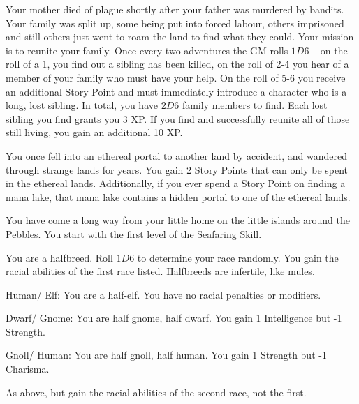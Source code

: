 \begin{multicols}{2}
\begin{list}{\addtocounter{list}{1}\textbf{:}}{\raggedleft}
	\item{Your mother died of plague shortly after your father was murdered by bandits.  Your family was split up, some being put into forced labour, others imprisoned and still others just went to roam the land to find what they could.  Your mission is to reunite your family.  Once every two adventures the GM rolls $1D6$ -- on the roll of a 1, you find out a sibling has been killed, on the roll of 2-4 you hear of a member of your family who must have your help.  On the roll of 5-6 you receive an additional Story Point and must immediately introduce a character who is a long, lost sibling.  In total, you have $2D6$ family members to find.  Each lost sibling you find grants you 3 XP.  If you find and successfully reunite all of those still living, you gain an additional 10 XP.}

	\item{You once fell into an ethereal portal to another land by accident, and wandered through strange lands for years.  You gain 2 Story Points that can only be spent in the ethereal lands.  Additionally, if you ever spend a Story Point on finding a mana lake, that mana lake contains a hidden portal to one of the ethereal lands.}

	\item{You have come a long way from your little home on the little islands around the Pebbles.  You start with the first level of the Seafaring Skill.}

	\item{You are a halfbreed.  Roll $1D6$ to determine your race randomly.  You gain the racial abilities of the first race listed.  Halfbreeds are infertile, like mules.}

		\setcounter{enc}{1}
		\begin{list}{\addtocounter{enc}{1}-\addtocounter{enc}{1}:}{}
			\item{Human/ Elf: You are a half-elf.  You have no racial penalties or modifiers.}

			\item{Dwarf/ Gnome: You are half gnome, half dwarf.  You gain 1 Intelligence but -1 Strength.}

			\item{Gnoll/ Human: You are half gnoll, half human.  You gain 1 Strength but -1 Charisma.}
		\end{list}

\item{As above, but gain the racial abilities of the second race, not the first.}


\end{list}
\end{multicols}
